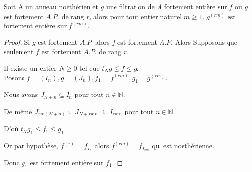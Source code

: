 \begin{maproposition}
	Soit A un anneau noethérien et $g$ une filtration de $A$ fortement entière sur $f$ ou $g$ est fortement $A.P.$ de rang $r$, alors pour tout entier naturel $m \geqslant 1$, $g^{(rm)}$ est fortement entière sur $f^{(rm)}$.  
\end{maproposition}
\begin{proof}
	Si $g$ est fortement $A.P.$ alors $f$ est fortement $A.P.$
	Alors Supposons que seulement $f$ est fortement $A.P.$ de rang $r.$
	
	Il existe un entier $N\geq 0$ tel que $t_{N}g\leq f\leq g.$\\
	Posons $f=(I_{n}),g=(J_{n}),f_{1}=f^{(rm)},g_{1}=g^{(rm)}.$
	
	Nous avons $J_{N+n}\subseteq I_{n}$ pour tout $n\in \mathbb{N}.$
	
	De même $J_{rm(N+n)}\subseteq J_{N+rmn}$ $\subseteq I_{rmn}$  pour tout $n\in \mathbb{N}.$
	
	D'où $t_{N}g_{1}\leq f_{1}\leq g_{1}.$
	
	Or par hypothèse, $f^{(r)}=f_{I_{r}\text{ }}$alors $f^{(rm)}=f_{I_{rm}}$ qui est noethérienne.
	
	Donc $g_{1}$ est fortement entière sur $f_{1}.$
\end{proof}

